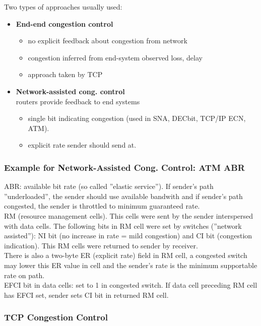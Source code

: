 \documentclass[10pt, a4paper, twocolumn]{scrartcl}
\begin{document}
Two types of approaches usually used:
\begin{itemize}
	\item \textbf{End-end congestion control}
		\begin{itemize}
			\item no explicit feedback about congestion from network
			\item congestion inferred from end-system observed loss, delay
			\item approach taken by TCP
		\end{itemize}
	\item \textbf{Network-assisted cong. control}\\ 
		routers provide feedback to end systems
		\begin{itemize}
			\item single bit indicating congestion (used in SNA, DECbit, TCP/IP ECN, ATM).
			\item explicit rate sender should send at.
		\end{itemize}
\end{itemize}

\subsubsection{Example for Network-Assisted Cong. Control: ATM ABR}

ABR: available bit rate (so called ''elastic service''). If sender's path ''underloaded'', the sender should use available bandwith and if sender's path congested, the sender is throttled to minimum guaranteed rate. \\

RM (resource management cells). This cells were sent by the sender interspersed with data cells. The following bits in RM cell were set by switches (''network assisted''): NI bit (no increase in rate = mild congestion) and CI bit (congestion indication). This RM cells were returned to sender by receiver.\\

There is also a two-byte ER (explicit rate) field in RM cell, a congested switch may lower this ER value in cell and the sender's rate is the minimum supportable rate on path.\\

EFCI bit in data cells: set to 1 in congested switch. If data cell preceding RM cell has EFCI set, sender sets CI bit in returned RM cell.

\subsubsection{TCP Congestion Control}
\end{document}

